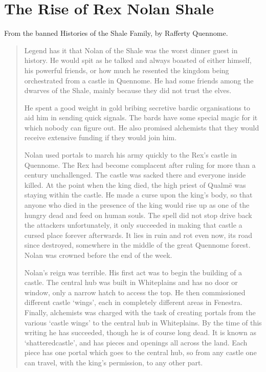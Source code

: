 \section{The Rise of Rex Nolan Shale}
\label{nolan}

\begin{multicols}{2}

\noindent From the banned Histories of the Shale Family, by Rafferty Quennome.

\begin{quotation}

  Legend has it that Nolan of the Shale was the worst dinner guest in history.
  He would spit as he talked and always boasted of either himself, his powerful friends, or how much he resented the kingdom being orchestrated from a castle in Quennome.
  He had some friends among the dwarves of the Shale, mainly because they did not trust the elves.

  He spent a good weight in gold bribing secretive bardic organisations to aid him in sending quick signals.
  The bards have some special magic for it which nobody can figure out.
  He also promised \gls{alchemists} that they would receive extensive funding if they would join him.

  Nolan used portals to march his army quickly to the Rex's castle in Quennome.
  The Rex had become complacent after ruling for more than a century unchallenged.
  The castle was sacked there and everyone inside killed.
  At the point when the king died, the high priest of Qualm\"{e} was staying within the castle.
  He made a curse upon the king's body, so that anyone who died in the presence of the king would rise up as one of the hungry dead and feed on human souls.
  The spell did not stop drive back the attackers unfortunately, it only succeeded in making that castle a cursed place forever afterwards.
  It lies in ruin and rot even now, its road since destroyed, somewhere in the middle of the great Quennome forest.
  Nolan was crowned before the end of the week.

  Nolan's reign was terrible.
  His first act was to begin the building of a castle.
  The central hub was built in Whiteplains and has no door or window, only a narrow hatch to access the top.
  He then commissioned different castle `wings', each in completely different areas in Fenestra.
  Finally, \gls{alchemists} was charged with the task of creating portals from the various `castle wings' to the central hub in Whiteplains.
  By the time of this writing he has succeeded, though he is of course long dead.
  It is known as `\gls{shatteredcastle}', and has pieces and openings all across the land.
  Each piece has one portal which goes to the central hub, so from any castle one can travel, with the king's permission, to any other part.


\end{quotation}
\end{multicols}
